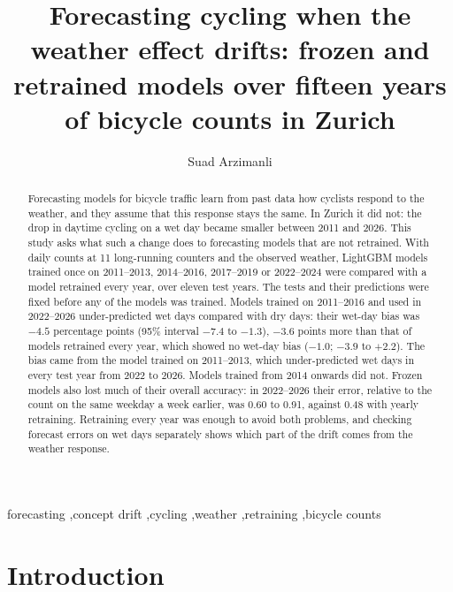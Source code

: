 \documentclass[preprint,12pt,authoryear]{elsarticle}
\begin{document}
\begin{frontmatter}

\title{Forecasting cycling when the weather effect drifts: frozen and retrained models over fifteen years of bicycle counts in Zurich}

\author{Suad Arzimanli}
\address{Faculty of Mathematics and Computer Science, University of \L{}\'od\'z, Poland}

\begin{abstract}
Forecasting models for bicycle traffic learn from past data how cyclists respond to the weather, and they assume that this response stays the same. In Zurich it did not: the drop in daytime cycling on a wet day became smaller between 2011 and 2026. This study asks what such a change does to forecasting models that are not retrained. With daily counts at 11 long-running counters and the observed weather, LightGBM models trained once on 2011--2013, 2014--2016, 2017--2019 or 2022--2024 were compared with a model retrained every year, over eleven test years. The tests and their predictions were fixed before any of the models was trained. Models trained on 2011--2016 and used in 2022--2026 under-predicted wet days compared with dry days: their wet-day bias was $-4.5$ percentage points (95\% interval $-7.4$ to $-1.3$), $-3.6$ points more than that of models retrained every year, which showed no wet-day bias ($-1.0$; $-3.9$ to $+2.2$). The bias came from the model trained on 2011--2013, which under-predicted wet days in every test year from 2022 to 2026. Models trained from 2014 onwards did not. Frozen models also lost much of their overall accuracy: in 2022--2026 their error, relative to the count on the same weekday a week earlier, was 0.60 to 0.91, against 0.48 with yearly retraining. Retraining every year was enough to avoid both problems, and checking forecast errors on wet days separately shows which part of the drift comes from the weather response.
\end{abstract}

\begin{keyword}
forecasting \sep concept drift \sep cycling \sep weather \sep retraining \sep bicycle counts
\end{keyword}

\end{frontmatter}

\section{Introduction}
\end{document}
